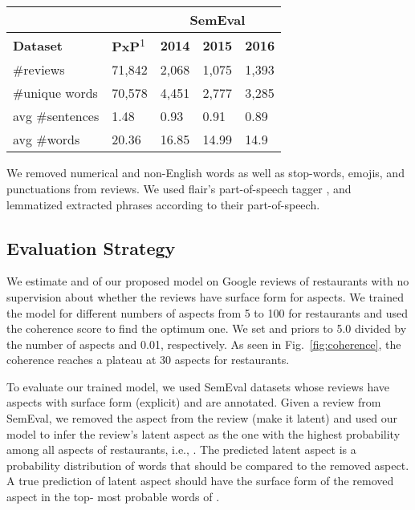 \documentclass[11pt]{article}
\begin{document}
\begin{table}[]
\begin{tabular}{lllll}
\cline{3-5}
                    &              & \multicolumn{3}{c}{\textbf{SemEval}}          \\ \hline
\textbf{Dataset}    & \textbf{PxP}\textsuperscript{1} & \textbf{2014} & \textbf{2015} & \textbf{2016} \\ \hline
{\#reviews}       & 71,842       & 2,068         & 1,075         & 1,393         \\
{\#unique words}  & 70,578       & 4,451         & 2,777         & 3,285         \\
{avg \#sentences} & 1.48         & 0.93          & 0.91          & 0.89          \\
{avg \#words}     & 20.36        & 16.85         & 14.99         & 14.9          \\ \hline
\end{tabular}
\end{table}
We removed numerical and non-English words as well as stop-words, emojis, and punctuations from reviews. We used flair's part-of-speech tagger \cite{flair_2019}, and lemmatized extracted phrases according to their part-of-speech.

\subsection{Evaluation Strategy}
We estimate  and  of our proposed model on Google reviews of restaurants with no supervision about whether the reviews have surface form for aspects. We trained the model for different numbers of aspects from 5 to 100 for restaurants and used the coherence score \cite{Mimno_2011} to find the optimum one. We set  and  priors to 5.0 divided by the number of aspects and 0.01, respectively. As seen in Fig.~\ref{fig:coherence}, the coherence reaches a plateau at 30 aspects for restaurants.

To evaluate our trained model, we used SemEval datasets whose reviews have aspects with surface form (explicit) and are annotated. Given a review from SemEval, we removed the aspect from the review (make it latent) and used our model to infer the review's latent aspect as the one with the highest probability among all aspects of restaurants, i.e., . The predicted latent aspect  is a probability distribution of words that should be compared to the removed aspect. A true prediction of latent aspect  should have the surface form of the removed aspect in the top- most probable words of . 
\end{document}
